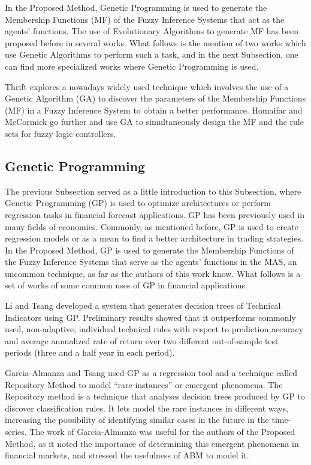 \documentclass[12pt,journal,draftcls,onecolumn]{IEEEtran}
\begin{document}
In the Proposed Method, Genetic Programming is used to generate the Membership Functions (MF) of the Fuzzy Inference Systems that act as the agents' functions. The use of Evolutionary Algorithms to generate MF has been proposed before in several works. What follows is the mention of two works which use Genetic Algorithms to perform such a task, and in the next Subsection, one can find more specialized works where Genetic Programming is used.

Thrift \cite{Thrift1991} explores a nowadays widely used technique which involves the use of a Genetic Algorithm (GA) to discover the parameters of the Membership Functions (MF) in a Fuzzy Inference System to obtain a better performance. Homaifar and McCormick \cite{Homaifar1995} go further and use GA to simultaneously design the MF and the rule sets for fuzzy logic controllers.

\subsection{Genetic Programming}
\label{genetic-programming}

The previous Subsection served as a little introduction to this Subsection, where Genetic Programming (GP) is used to optimize architectures or perform regression tasks in financial forecast applications. GP has been previously used in many fields of economics. Commonly, as mentioned before, GP is used to create regression models or as a mean to find a better architecture in trading strategies. In the Proposed Method, GP is used to generate the Membership Functions of the Fuzzy Inference Systems that serve as the agents' functions in the MAS, an uncommon technique, as far as the authors of this work know. What follows is a set of works of some common uses of GP in financial applications.

Li and Tsang \cite{Li1999} developed a system that generates decision trees of Technical Indicators using GP. Preliminary results showed that it outperforms commonly used, non-adaptive, individual technical rules with respect to prediction accuracy and average annualized rate of return over two different out-of-sample test periods (three and a half year in each period).

Garcia-Almanza and Tsang \cite{Garcia-Almanza2006} used GP as a regression tool and a technique called Repository Method to model ``rare instances'' or emergent phenomena. The Repository method is a technique that analyses decision trees produced by GP to discover classification rules. It lets model the rare instances in different ways, increasing the possibility of identifying similar cases in the future in the time-series. The work of Garcia-Almanza was useful for the authors of the Proposed Method, as it noted the importance of determining this emergent phenomena in financial markets, and stressed the usefulness of ABM to model it.
\end{document}
